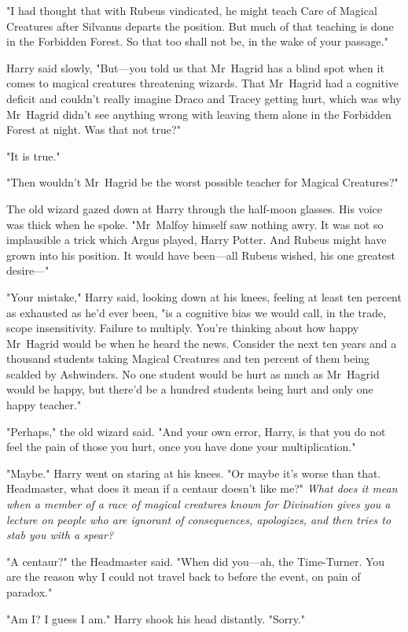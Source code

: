 "I had thought that with Rubeus vindicated, he might teach Care of Magical
Creatures after Silvanus departs the position. But much of that teaching is
done in the Forbidden Forest. So that too shall not be, in the wake of your
passage."

Harry said slowly, "But---you told us that Mr~Hagrid has a blind spot when it
comes to magical creatures threatening wizards. That Mr~Hagrid had a cognitive
deficit and couldn't really imagine Draco and Tracey getting hurt, which was
why Mr~Hagrid didn't see anything wrong with leaving them alone in the
Forbidden Forest at night. Was that not true?"

"It is true."

"Then wouldn't Mr~Hagrid be the worst possible teacher for Magical Creatures?"

The old wizard gazed down at Harry through the half-moon glasses. His voice was
thick when he spoke. "Mr~Malfoy himself saw nothing awry. It was not so
implausible a trick which Argus played, Harry Potter. And Rubeus might have
grown into his position. It would have been---all Rubeus wished, his one
greatest desire---"

"Your mistake," Harry said, looking down at his knees, feeling at least ten
percent as exhausted as he'd ever been, "is a cognitive bias we would call, in
the trade, scope insensitivity. Failure to multiply. You're thinking about how
happy Mr~Hagrid would be when he heard the news. Consider the next ten years
and a thousand students taking Magical Creatures and ten percent of them being
scalded by Ashwinders. No one student would be hurt as much as Mr~Hagrid would
be happy, but there'd be a hundred students being hurt and only one happy
teacher."

"Perhaps," the old wizard said. "And your own error, Harry, is that you do not
feel the pain of those you hurt, once you have done your multiplication."

"Maybe." Harry went on staring at his knees. "Or maybe it's worse than that.
Headmaster, what does it mean if a centaur doesn't like me?" \emph{What does it
mean when a member of a race of magical creatures known for Divination gives
you a lecture on people who are ignorant of consequences, apologizes, and then
tries to stab you with a spear?}

"A centaur?" the Headmaster said. "When did you---ah, the Time-Turner. You are
the reason why I could not travel back to before the event, on pain of paradox."

"Am I? I guess I am." Harry shook his head distantly. "Sorry."

